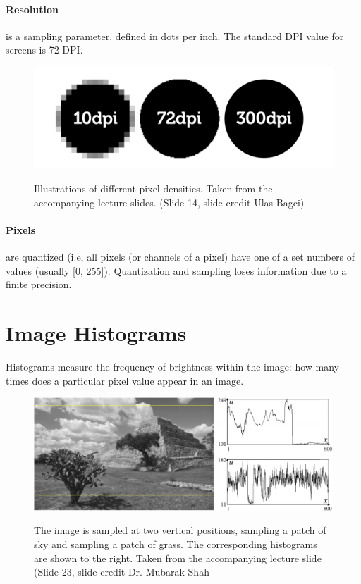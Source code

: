 \documentclass{article}
\begin{document}
\paragraph{Resolution} is a sampling parameter, defined in dots per inch. The standard DPI value for screens is 72 DPI.
\begin{figure}[h!]
\begin{center}
\includegraphics[scale=0.4]{res.png} \\
\caption{Illustrations of different pixel densities. Taken from the accompanying lecture slides. (Slide 14, slide credit Ulas Bagci)
            }
\end{center}
\end{figure}

				\paragraph{Pixels} are quantized (i.e, all pixels (or channels of a pixel) have one of a set numbers of values (usually [0, 255]). Quantization and sampling loses information due to a finite precision.

\section{Image Histograms}
Histograms measure the frequency of brightness within the image: how many times does a particular pixel value appear in an image. \\

\begin{figure}[h!]
\begin{center}
\includegraphics[scale=0.4]{histogram.png} \\
\caption{The image is sampled at two vertical positions, sampling a patch of sky and sampling a patch of grass. The corresponding histograms are shown to the right. Taken from the accompanying lecture slide (Slide 23, slide credit Dr. Mubarak Shah}
\end{center}
\end{figure}
\end{document}
